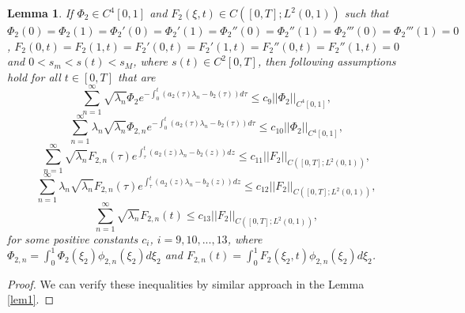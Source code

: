 \documentclass[preprint,12pt,authoryear]{elsarticle}
\newtheorem{lemma}{Lemma}
\begin{document}
\begin{lemma}\label{lem2}
    If $\Phi_2\in C^4[0,1]$ and $F_2(\xi,t)\in C([0,T];L^2(0,1))$ such that $\Phi_{2}(0)=\Phi_{2}(1)=\Phi_{2}'(0)=\Phi_{2}'(1)=\Phi_{2}''(0)=\Phi_{2}''(1)=\Phi_{2}'''(0)=\Phi_{2}'''(1)=0$, $F_2(0,t)=F_2(1,t)=F_2'(0,t)=F_2'(1,t)=F_2''(0,t)=F_2''(1,t)=0$ and $0<s_m<s(t)<s_M$, where $s(t)\in C^2[0,T]$, then following assumptions hold for all $t\in[0,T]$ that are
    \begin{equation}\label{eq33}
        \sum\limits_{n=1}^{\infty}\sqrt{\lambda_{n}}\Phi_2e^{-\int_0^t(a_2(\tau)\lambda_{n}-b_2(\tau))d\tau}\leq c_9||\Phi_2||_{C^4[0,1]},
    \end{equation}
    \begin{equation}\label{eq34}
        \sum\limits_{n=1}^{\infty}\lambda_{n}\sqrt{\lambda_{n}}\Phi_{2,n}e^{-\int_0^t(a_2(\tau)\lambda_{n}-b_2(\tau))d\tau}\leq c_{10}||\Phi_2||_{C^4[0,1]},
    \end{equation}
    \begin{equation}\label{eq35}
        \sum\limits_{n=1}^{\infty}\sqrt{\lambda_{n}}F_{2,n}(\tau)e^{\int_{\tau}^t(a_2(z)\lambda_{n}-b_2(z))dz}\leq c_{11}||F_2||_{C([0,T];L^2(0,1))},
    \end{equation}
    \begin{equation}\label{eq36}
        \sum\limits_{n=1}^{\infty}\lambda_{n}\sqrt{\lambda_{n}}F_{2,n}(\tau)e^{\int_{\tau}^t(a_2(z)\lambda_{n}-b_2(z))dz}\leq c_{12}||F_2||_{C([0,T];L^2(0,1))},
    \end{equation}
    \begin{equation}\label{eq37}
        \sum\limits_{n=1}^{\infty}\sqrt{\lambda_{n}}F_{2,n}(t)\leq c_{13}||F_2||_{C([0,T];L^2(0,1))},
    \end{equation}
for some positive constants $c_i$, $i=9,10,...,13$, where $\Phi_{2,n}=\int_0^1\Phi_{2}(\xi_2)\phi_{2,n}(\xi_2)d\xi_2$ and $F_{2,n}(t)=\int_0^1F_{2}(\xi_2,t)\phi_{2,n}(\xi_2)d\xi_2$.
\end{lemma}
\begin{proof}
    We can verify these inequalities by similar approach in the Lemma \ref{lem1}.
\end{proof}
\end{document}
